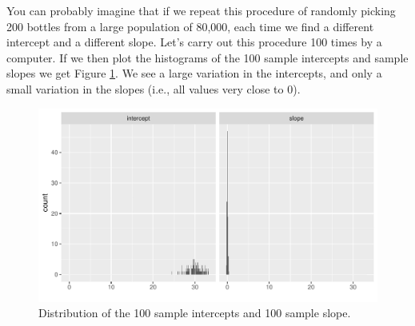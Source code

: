 \documentclass[]{report}\usepackage[]{graphicx}\usepackage[]{color}
\makeatletter
\def\maxwidth{ %
  \ifdim\Gin@nat@width>\linewidth
    \linewidth
  \else
    \Gin@nat@width
  \fi
}
\newenvironment{knitrout}{}{} %
\makeatother
\begin{document}
You can probably imagine that if we repeat this procedure of randomly picking 200 bottles from a large population of 80,000, each time we find a different intercept and a different slope. Let's carry out this procedure 100 times by a computer. If we then plot the histograms of the 100 sample intercepts and sample slopes we get Figure \ref{fig:inf_3}. We see a large variation in the intercepts, and only a small variation in the slopes (i.e., all values very close to 0).




\begin{knitrout}
\color{fgcolor}\begin{figure}

{\centering \includegraphics[width=\maxwidth]{figure/inf_3-1} 

}

\caption[Distribution of the 100 sample intercepts and 100 sample slope]{Distribution of the 100 sample intercepts and 100 sample slope.}\label{fig:inf_3}
\end{figure}


\end{knitrout}
\end{document}
